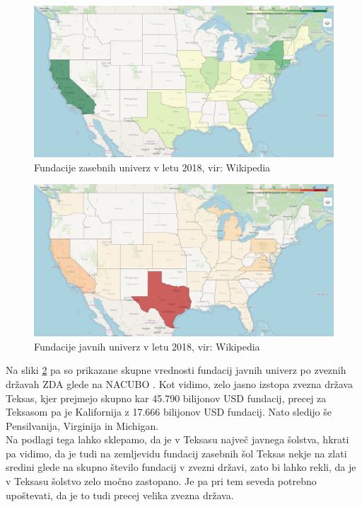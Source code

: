 \documentclass[12pt, a4paper]{article}
\begin{document}
\begin{figure}[!h]
\centering
\includegraphics[width = 15 cm]{grafi_zemljevidi/zemljevid_zasebnih.png}
\caption{Fundacije zasebnih univerz v letu 2018, vir: Wikipedia}
\label{Slika 1}
\end{figure}


\begin{figure}[!h]
\centering
\includegraphics[width = 15 cm]{grafi_zemljevidi/zemljevid_javnih.png}
\caption{Fundacije javnih univerz v letu 2018, vir: Wikipedia}
\label{Slika 2}
\end{figure}

Na sliki \ref{Slika 2} pa so prikazane skupne vrednosti fundacij javnih univerz po zveznih državah ZDA glede na NACUBO \cite{wiki}. Kot vidimo, zelo jasno izstopa zvezna država Teksas, kjer prejmejo skupno kar 45.790 bilijonov USD fundacij, precej za Teksasom pa je Kalifornija z 17.666 bilijonov USD fundacij. Nato sledijo še Pensilvanija, Virginija in Michigan. \\

Na podlagi tega lahko sklepamo, da je v Teksasu največ javnega šolstva, hkrati pa vidimo, da je tudi na zemljevidu fundacij zasebnih šol Teksas nekje na zlati sredini glede na skupno število fundacij v zvezni državi, zato bi lahko rekli, da je v Teksasu šolstvo zelo močno zastopano. Je pa pri tem seveda potrebno upoštevati, da je to tudi precej velika zvezna država. \\
\end{document}
